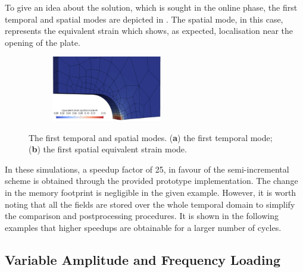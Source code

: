 To give an idea about the solution, which is sought in the online phase, the first temporal and spatial modes are depicted in . The spatial mode, in this case, represents the equivalent strain which shows, as expected, localisation near the opening of the plate.
\begin{figure}[hbt!]
	\centering
	\begin{subfigure}[]{0.49\linewidth}
		
		\caption{}
	\end{subfigure}
	\hfil
	\begin{subfigure}[]{0.49\linewidth}
		\hspace*{0.5cm}
		\includegraphics[width=.8\linewidth,height=28.5mm]{./figures/verify/first_strain_spatial_mode.png}
		\caption{}
	\end{subfigure}
	\caption{The first temporal and spatial modes. (\textbf{a}) the first temporal mode; (\textbf{b}) the first spatial equivalent strain mode.}
	\label{fig_ver_first_pair_mode}
\end{figure}

In these simulations, a speedup factor of 25, in favour of the semi-incremental scheme is obtained through the provided prototype implementation. The change in the memory footprint is negligible in the given example. However, it is worth noting that all the fields are stored over the whole temporal domain to simplify the comparison and postprocessing procedures. It is shown in the following examples that higher speedups are obtainable for a larger number of cycles.


\subsection{Variable Amplitude and Frequency Loading}
\label{var_ampl_freq}

